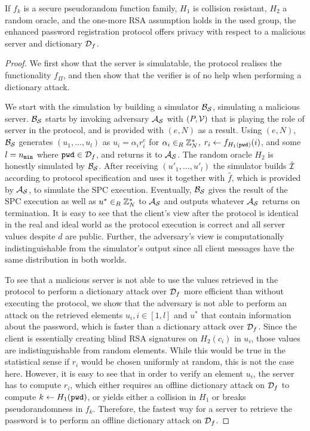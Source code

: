 \begin{lemma}[Privacy]\label{lem:privacy}
If $f_k$ is a secure pseudorandom function family, $H_1$ is collision resistant, $H_2$ a random oracle, and the one-more RSA assumption holds in the used group, the enhanced password registration protocol offers privacy with respect to a malicious server and dictionary $\mathcal{D}_f$.
\end{lemma}

\begin{proof}
  We first show that the server is simulatable, \ie the protocol realises the functionality $f_\Pi$, and then show that the verifier \ver is of no help when performing a dictionary attack.
  
  We start with the simulation by building a simulator $\mathcal{B}_\mathcal{S}$, simulating a malicious server.
  $\mathcal{B}_\mathcal{S}$ starts by invoking adversary $\mathcal{A}_\mathcal{S}$ with $(P, \mathcal{V})$ that is playing the role of server \Server in the protocol, and is provided with $(e,N)$ as a result.
  Using $(e,N)$, $\mathcal{B}_\mathcal{S}$ generates $(u_1, \dots, u_l)$ as $u_i=\alpha_i r_i^e$ for $\alpha_i\in_R \mathbb{Z}^\ast_N$, $r_i\gets f_{H_1(\mathtt{pwd})}(i)$, and some $l={n_\mathtt{min}}$ where $\mathtt{pwd}\in\mathcal{D}_f$, and returns it to $\mathcal{A}_\mathcal{S}$.
  The random oracle $H_2$ is honestly simulated by $\mathcal{B}_\mathcal{S}$.
  After receiving $(u'_1, \dots, u'_l)$ the simulator builds $\hat{\mathcal{I}}$ according to protocol specification and uses it together with $\hat{f}$, which is provided by $\mathcal{A}_\mathcal{S}$, to simulate the \ac{SPC} execution.
  Eventually, $\mathcal{B}_\mathcal{S}$ gives the result of the \ac{SPC} execution as well as $u^\ast\in_R\mathbb{Z}^\ast_N$ to $\mathcal{A}_\mathcal{S}$ and outputs whatever $\mathcal{A}_\mathcal{S}$ returns on termination.
  It is easy to see that the client's view after the protocol is identical in the real and ideal world as the protocol execution is correct and all server values despite $d$ are public.
  Further, the adversary's view is computationally indistinguishable from the simulator's output since all client messages have the same distribution in both worlds.
  
  To see that a malicious server is not able to use the values retrieved in the protocol to perform a dictionary attack over $\mathcal{D}_f$ more efficient than without executing the protocol, \ie we show that the adversary is not able to perform an attack on the retrieved elements $u_i, i\in[1,l]$ and $u^\ast$ that contain information about the password, which is faster than a dictionary attack over $\mathcal{D}_f$.
  Since the client is essentially creating blind RSA signatures on $H_2(c_i)$ in $u_i$, those values are indistinguishable from random elements.
  While this would be true in the statistical sense if $r_i$ would be chosen uniformly at random, this is not the case here.
  However, it is easy to see that in order to verify an element $u_i$, the server has to compute $r_i$, which either requires an offline dictionary attack on $\mathcal{D}_f$ to compute $k\gets H_1(\mathtt{pwd})$, or yields either a collision in $H_1$ or breaks pseudorandomness in $f_k$.
  Therefore, the fastest way for a server to retrieve the password is to perform an offline dictionary attack on $\mathcal{D}_f$.
  

\end{proof}
